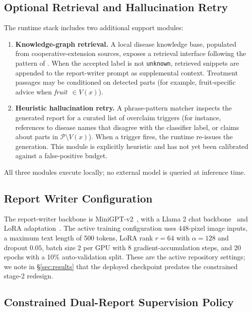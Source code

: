 \subsection{Optional Retrieval and Hallucination Retry}

The runtime stack includes two additional support modules:
\begin{enumerate}[leftmargin=1.3em]
    \item \textbf{Knowledge-graph retrieval.} A local disease knowledge
    base, populated from cooperative-extension sources, exposes a
    retrieval interface following the pattern of
    \citet{lewis2020rag}. When the accepted label is not
    \texttt{unknown}, retrieved snippets are appended to the
    report-writer prompt as supplemental context. Treatment passages may
    be conditioned on detected parts (for example, fruit-specific advice
    when \emph{fruit}~$\in V(x)$).
    \item \textbf{Heuristic hallucination retry.} A phrase-pattern matcher
    inspects the generated report for a curated list of overclaim
    triggers (for instance, references to disease names that disagree
    with the classifier label, or claims about parts in
    $\mathcal{P}\setminus V(x)$). When a trigger fires, the runtime
    re-issues the generation. This module is explicitly heuristic and
    has not yet been calibrated against a false-positive budget.
\end{enumerate}
All three modules execute locally; no external model is queried at
inference time.

\subsection{Report Writer Configuration}

The report-writer backbone is MiniGPT-v2~\citep{chen2023minigptv2}, with
a Llama 2 chat backbone~\citep{touvron2023llama2} and LoRA
adaptation~\citep{hu2021lora}. The active training configuration uses
448-pixel image inputs, a maximum text length of 500 tokens, LoRA rank
$r=64$ with $\alpha=128$ and dropout $0.05$, batch size 2 per GPU with 8
gradient-accumulation steps, and 20 epochs with a 10\% auto-validation
split. These are the active repository settings; we note in
\S\ref{sec:results} that the deployed checkpoint predates the constrained
stage-2 redesign.

\subsection{Constrained Dual-Report Supervision Policy}
\label{sec:dualpolicy}

